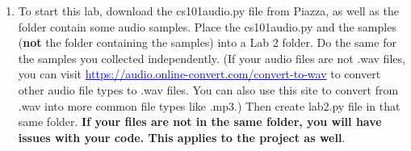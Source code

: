 \documentclass[11pt, letterpaper, onecolumn, oneside, final]{article}
\begin{document}
\begin{enumerate}

    \item To start this lab, download the cs101audio.py file from Piazza, as well as the folder contain some audio samples. Place the cs101audio.py and the samples (\textbf{not} the folder containing the samples) into a Lab 2 folder. Do the same for the samples you collected independently. (If your audio files are not {\consolas .wav} files, you can visit \textcolor{blue}{\underline{https://audio.online-convert.com/convert-to-wav}} to convert other audio file types to {\consolas .wav} files. You can also use this site to convert from {\consolas .wav} into more common file types like {\consolas .mp3}.) Then create {\consolas lab2.py} file in that same folder. \textbf{If your files are not in the same folder, you will have issues with your code. This applies to the project as well}. 


\end{enumerate}
\end{document}
